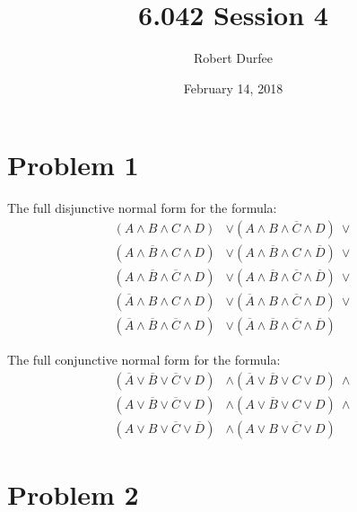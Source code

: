 \documentclass{article}
\title{ 6.042 Session 4 }
\author{ Robert Durfee }
\date{ February 14, 2018 }
\begin{document}
\maketitle

\section*{Problem 1}

The full disjunctive normal form for the formula:
\begin{align*}
  (A \land B \land C \land D) &\lor
  (A \land B \land \overline{C} \land D)\ \lor \\
  (A \land \overline{B} \land C \land D) &\lor
  (A \land \overline{B} \land C \land \overline{D})\ \lor \\
  (A \land \overline{B} \land \overline{C} \land D) &\lor
  (A \land \overline{B} \land \overline{C} \land \overline{D})\ \lor \\
  (\overline{A} \land B \land C \land D) &\lor
  (\overline{A} \land B \land \overline{C} \land D)\ \lor \\
  (\overline{A} \land \overline{B} \land \overline{C} \land D) &\lor
  (\overline{A} \land \overline{B} \land \overline{C} \land \overline{D})
\end{align*}

The full conjunctive normal form for the formula:
\begin{align*}
  (\overline{A} \lor \overline{B} \lor \overline{C} \lor D) &\land
  (\overline{A} \lor \overline{B} \lor C \lor D)\ \land \\
  (A \lor \overline{B} \lor \overline{C} \lor D) &\land
  (A \lor \overline{B} \lor C \lor D)\ \land \\
  (A \lor B \lor \overline{C} \lor \overline{D}) &\land
  (A \lor B \lor \overline{C} \lor D)
\end{align*}

\section*{Problem 2}
\end{document}
